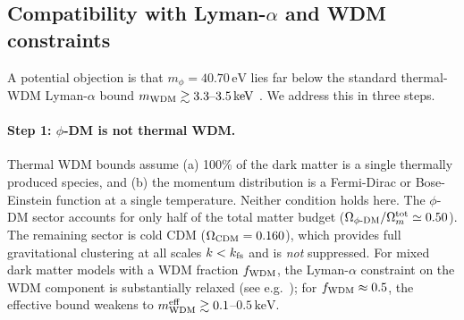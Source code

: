 \documentclass[12pt,a4paper]{article}
\newcommand{\phiDM}{\phi\text{-DM}}
\newcommand{\kfs}{k_{\rm fs}}
\newcommand{\mphi}{m_\phi}
\begin{document}
\subsection{Compatibility with Lyman-$\alpha$ and WDM constraints}
\label{subsec:lya}

A potential objection is that $\mphi = 40.70\,\mathrm{eV}$ lies far below the
standard thermal-WDM Lyman-$\alpha$ bound $m_{\rm WDM} \gtrsim 3.3\text{--}3.5\,\mathrm{keV}$
\citep{Viel2005,Viel2013,PalanqueDelabrouille2020}.  We address this in three steps.

\paragraph{Step 1: $\phi$-DM is not thermal WDM.}
Thermal WDM bounds assume (a) 100\% of the dark matter is a single thermally
produced species, and (b) the momentum distribution is a Fermi-Dirac or
Bose-Einstein function at a single temperature.  Neither condition holds here.
The $\phi$-DM sector accounts for only half of the total matter budget
($\Omega_{\phiDM}/\Omega_{m}^{\rm tot} \simeq 0.50$).
The remaining sector is cold CDM ($\Omega_{\rm CDM} = 0.160$), which provides
full gravitational clustering at all scales $k < \kfs$ and is \emph{not}
suppressed.  For mixed dark matter models with a WDM fraction $f_{\rm WDM}$,
the Lyman-$\alpha$ constraint on the WDM component is substantially relaxed
(see e.g.\ \citealt{Boyarsky2019,Adhikari2017}); for $f_{\rm WDM} \approx 0.5$, the
effective bound weakens to $m_{\rm WDM}^{\rm eff} \gtrsim 0.1$--$0.5\,\mathrm{keV}$.
\end{document}
